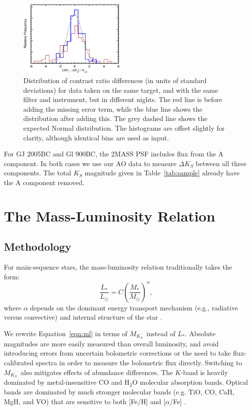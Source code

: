 \documentclass[twocolumn]{aastex62}
\newcommand{\mks}{$M_{K_S}$}
\begin{document}
\begin{figure}[t]
\begin{center}
\includegraphics[width=0.47\textwidth]{errors.eps}
\caption{Distribution of contrast ratio differences (in units of standard deviations) for data taken on the same target, and with the same filter and instrument, but in different nights. The red line is before adding the missing error term, while the blue line shows the distribution after adding this. The grey dashed line shows the expected Normal distribution. The histograms are offset slightly for clarity, although identical bins are used as input.}
\label{fig:magnitudes}
\end{center}
\end{figure}

For GJ 2005BC and Gl 900BC, the 2MASS PSF includes flux from the A component. In both cases we use our AO data to measure $\Delta K_S$ between all three components. The total $K_S$ magnitude given in Table~\ref{tab:sample} already have the A component removed. 

\section{The Mass-Luminosity Relation}\label{sec:relation}

\subsection{Methodology}\label{sec:methods}

For main-sequence stars, the mass-luminosity relation traditionally takes the form:
\begin{equation}\label{eqn:ml}
\frac{L_*}{L_\odot} = C \left(\frac{M_*}{M_\odot}\right)^\alpha,
\end{equation}
where $\alpha$ depends on the dominant energy transport mechanism (e.g., radiative versus convective) and internal structure of the star \citep{2004sipp.book.....H}. 

We rewrite Equation~\ref{eqn:ml} in terms of \mks\ instead of $L_*$. Absolute magnitudes are more easily measured than overall luminosity, and avoid introducing errors from uncertain bolometric corrections or the need to take flux-calibrated spectra in order to measure the bolometric flux directly. Switching to \mks\ also mitigates effects of abundance differences. The $K$-band is heavily dominated by metal-insensitive CO and H$_2$O molecular absorption bands. Optical bands are dominated by much stronger molecular bands (e.g. TiO, CO, CaH, MgH, and VO) that are sensitive to both [Fe/H] and [$\alpha$/Fe] \citep[Figure~\ref{fig:metal}, also see][]{Woolf:2006uq,Lepine:2007fk,Mann2013a}. 
\end{document}
